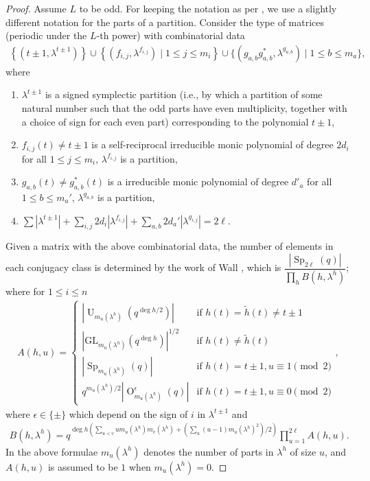 \documentclass[11pt,twoside]{amsart}
\newcommand{\GL}{\mathrm{GL}}
\newcommand{\Sp}{\operatorname{Sp}}
\newcommand{\Un}{\operatorname{U}}
\newcommand{\Or}{\operatorname{O}}
\theoremstyle{definition} %
\begin{document}
\begin{proof}
    Assume $L$ to be odd. 
    For keeping the notation as per \cite{Wall1963}, we use a slightly different notation for the parts of a partition.
    Consider the type of matrices (periodic under the $L$-th power) with combinatorial data
    \begin{align*}
        \left\{(t\pm 1,\lambda^{t\pm1})\right\}\cup\left\{(f_{i,j},\lambda^{f_{i,j}})\mid 1\leq j\leq m_i\right\}\cup\{(g_{a,b}g_{a,b}^*,\lambda^{g_{a,b}})\mid 1\leq b\leq m_a\},
    \end{align*}
    where \begin{enumerate}
        \item $\lambda^{t\pm 1}$ is a signed symplectic partition (i.e., by which a partition of some natural number such that the odd parts have even multiplicity, together with a choice of sign for each even part) corresponding to the polynomial $t\pm 1$,
        \item $f_{i,j}(t)\neq t\pm 1$ is a self-reciprocal irreducible monic polynomial of degree $2d_i$ for all $1\leq j\leq m_i$, $\lambda^{f_{i,j}}$ is a partition,
        \item $g_{a,b}(t)\neq g_{a,b}^*(t)$ is a irreducible monic polynomial of degree $d'_a$ for all $1\leq b\leq m_a'$, $\lambda^{g_{a,b}}$ is a partition,
        \item $\sum \limits |\lambda^{t\pm 1}|+\sum\limits_{i,j}2d_i|\lambda^{f_{i,j}}|+\sum\limits_{a,b}2d_a'|\lambda^{g_{i,j}}|=2\ell$.
    \end{enumerate}
    Given a matrix with the above combinatorial data, the number of elements in each conjugacy class is determined by the work of Wall \cite{Wall1963}, which is $\dfrac{|\Sp_{2\ell}(q)|}{\prod\limits_{h}B(h,\lambda^h) }$; where for $1\leq i \leq n$
    \begin{align*}
        A(h,u)=\begin{cases}
            |\Un_{m_u(\lambda^h)}(q^{\deg h/2})|&\text{if}\,\,h(t)=\widetilde{h}(t)\neq t\pm 1\\
            |\GL_{m_u(\lambda^h)}(q^{\deg h})|^{1/2}&\text{if}\,\, h(t)\neq\widetilde{h}(t)\\
            |\Sp_{m_u(\lambda^h)}(q)|&\text{if}\,\,h(t)=t\pm 1,u\equiv 1\pmod{2}\\
            q^{m_u(\lambda^h)/2}|\Or^\epsilon_{m_u(\lambda^h)}(q)| &\text{if}\,\,h(t)=t\pm 1,u\equiv 0\pmod{2}
        \end{cases},
    \end{align*}
    where $\epsilon\in\{\pm\}$ which depend on the sign of $i$ in $\lambda^{t\pm 1}$ and 
    \begin{align*}
        B(h,\lambda^h)=q^{\deg h\left(\sum_{u<v}um_u(\lambda^h)m_v(\lambda^h)+(\sum_{u}(u-1)m_u(\lambda^h)^2)/2\right)}\prod\limits_{u=1}^{2\ell}A(h,u).
    \end{align*}
    In the above formulae $m_u(\lambda^h)$ denotes the number of parts in $\lambda^h$ of size $u$, and $A(h,u)$ is assumed to be $1$ when $m_u(\lambda^h)=0$.


\end{proof}
\end{document}
